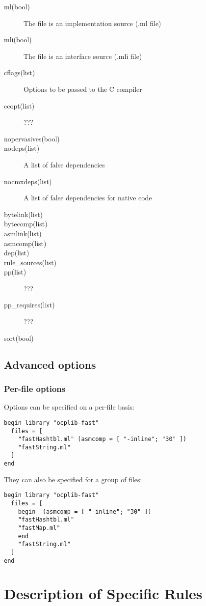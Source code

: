 \begin{description}
\item[ml(bool)] The file is an implementation source (.ml file)
\item[mli(bool)] The file is an interface source (.mli file)
\item[cflags(list)] Options to be passed to the C compiler
\item[ccopt(list)] ???
\item[nopervasives(bool)]
\item[nodeps(list)] A list of false dependencies
\item[nocmxdeps(list)] A list of false dependencies for native code
\item[bytelink(list)]
\item[bytecomp(list)]
\item[asmlink(list)]
\item[asmcomp(list)]
\item[dep(list)]
\item[rule\_sources(list)]
\item[pp(list)] ???
\item[pp\_requires(list)] ???
\item[sort(bool)]
\end{description}


\subsection{Advanced options}

\subsubsection{Per-file options}

Options can be specified on a per-file basis:

\begin{verbatim}
begin library "ocplib-fast"
  files = [
    "fastHashtbl.ml" (asmcomp = [ "-inline"; "30" ])
    "fastString.ml"
  ]
end
\end{verbatim}

They can also be specified for a group of files:

\begin{verbatim}
begin library "ocplib-fast"
  files = [
    begin  (asmcomp = [ "-inline"; "30" ])
    "fastHashtbl.ml"
    "fastMap.ml"
    end
    "fastString.ml"
  ]
end
\end{verbatim}


\section{Description of Specific Rules}

